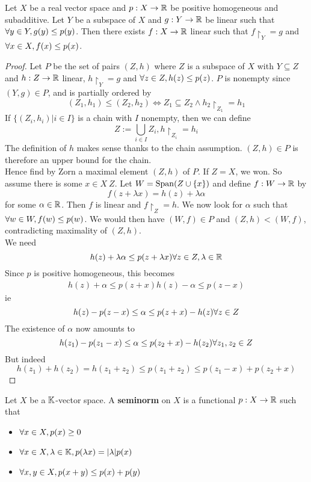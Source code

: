 \documentclass{article}
\begin{document}
\begin{nthm}\label{thm:hb-positive}
  Let $X$ be a real vector space and $p : X \rightarrow \mathbb R$ be positive homogeneous and subadditive. Let $Y$ be a subspace of $X$ and $g : Y \rightarrow \mathbb R$ be linear such that $\forall y \in Y, g(y) \le p(y)$. Then there exists $f : X \rightarrow \mathbb R$ linear such that $f\restriction_Y = g$ and $\forall x \in X, f(x) \le p(x)$.
\end{nthm}
\begin{proof}
  Let $P$ be the set of pairs $(Z, h)$ where $Z$ is a subspace of $X$ with $Y \subseteq Z$ and $h : Z \rightarrow \mathbb R$ linear, $h\restriction_Y = g$ and $\forall z \in Z, h(z) \le p(z)$. $P$ is nonempty since $(Y, g) \in P$, and is partially ordered by
  $$(Z_1, h_1) \le (Z_2, h_2) \iff Z_1 \subseteq Z_2 \land h_2\restriction_{Z_1} = h_1$$
  If $\{(Z_i, h_i) | i \in I\}$ is a chain with $I$ nonempty, then we can define
  $$Z := \bigcup_{i \in I} Z_i, h\restriction_{Z_i} = h_i$$
  The definition of $h$ makes sense thanks to the chain assumption. $(Z, h) \in P$ is therefore an upper bound for the chain. \\
  Hence find by Zorn a maximal element $(Z, h)$ of $P$. If $Z = X$, we won. So assume there is some $x \in X \ Z$. Let $W = \mathrm{Span}(Z \cup \{x\})$ and define $f : W \rightarrow \mathbb R$ by
  $$f(z + \lambda x) = h(z) + \lambda\alpha$$
  for some $\alpha \in \mathbb R$. Then $f$ is linear and $f\restriction_Z = h$. We now look for $\alpha$ such that $\forall w \in W, f(w) \le p(w)$. We would then have $(W, f) \in P$ and $(Z, h) < (W, f)$, contradicting maximality of $(Z, h)$. \\
  We need
  $$h(z) + \lambda\alpha \le p(z + \lambda x) \forall z \in Z, \lambda \in \mathbb R$$
  Since $p$ is positive homogeneous, this becomes
  \begin{align}
    h(z) + \alpha \le p(z + x)
    h(z) - \alpha \le p(z - x)
  \end{align}
  ie
  $$h(z) - p(z - x) \le \alpha \le p(z + x) - h(z) \forall z \in Z$$
  The existence of $\alpha$ now amounts to
  $$h(z_1) - p(z_1 - x) \le \alpha \le p(z_2 + x) - h(z_2) \forall z_1, z_2 \in Z$$
  But indeed
  $$h(z_1) + h(z_2) = h(z_1 + z_2) \le p(z_1 + z_2) \le p(z_1 - x) + p(z_2 + x)$$
\end{proof}

\begin{defi}
  Let $X$ be a $\mathbb K$-vector space. A {\bf seminorm} on $X$ is a functional $p : X \rightarrow \mathbb R$ such that
  \begin{itemize}
    \item $\forall x \in X, p(x) \ge 0$
    \item $\forall x \in X, \lambda \in \mathbb K, p(\lambda x) = |\lambda| p(x)$
    \item $\forall x, y \in X, p(x + y) \le p(x) + p(y)$
  \end{itemize}
\end{defi}
\end{document}
